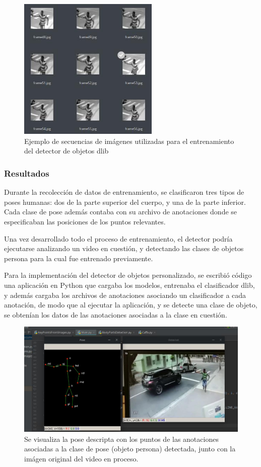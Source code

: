 \documentclass[a4paper,12pt,oneside,spanish]{book}
\begin{document}
\begin{figure}[h!]
	\includegraphics[width=190pt]{Imagenes/dataset1.jpg}
	\centering
	\caption{Ejemplo de secuencias de imágenes utilizadas para el entrenamiento del detector de objetos dlib}
	\label{fig:dataset1}
\end{figure}

\subsubsection{Resultados}
Durante la recolección de datos de entrenamiento, se clasificaron tres tipos de poses humanas: dos de la parte superior del cuerpo, y una de la parte inferior. Cada clase de pose además contaba con su archivo de anotaciones donde se especificaban las posiciones de los puntos relevantes.\par

Una vez desarrollado todo el proceso de entrenamiento, el detector podría ejecutarse analizando un video en cuestión, y detectando las clases de objetos persona para la cual fue entrenado previamente.\par

Para la implementación del detector de objetos personalizado, se escribió código una aplicación en Python que cargaba los modelos, entrenaba el clasificador dlib, y además cargaba los archivos de anotaciones asociando un clasificador a cada anotación, de modo que al ejecutar la aplicación, y se detecte una clase de objeto, se obtenían los datos de las anotaciones asociadas a la clase en cuestión.\par

\begin{figure}[h!]
	\includegraphics[width=330pt]{Imagenes/results1.jpg}
	\centering	
	\caption{Se visualiza la pose descripta con los puntos de las anotaciones asociadas a la clase de pose (objeto persona) detectada, junto con la imágen original del video en proceso.}
	\label{fig:results1}
\end{figure}	
\end{document}
